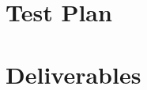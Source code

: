 \documentclass[paper=a4, fontsize=11pt]{report} %
\begin{document}


\chapter{Test Plan} %
\label{cha:test_plan}





\chapter{Deliverables} %
\label{cha:deliverables}



\end{document}
